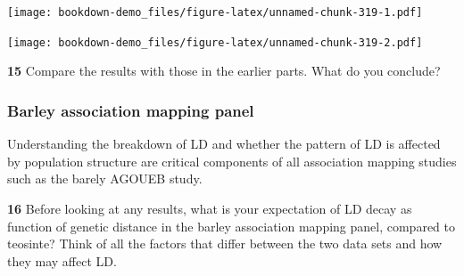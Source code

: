 \documentclass[
]{book}
\makeatletter
\newenvironment{Shaded}{\begin{snugshade}}{\end{snugshade}}
\newcommand{\AttributeTok}[1]{\textcolor[rgb]{0.77,0.63,0.00}{#1}}
\newcommand{\DecValTok}[1]{\textcolor[rgb]{0.00,0.00,0.81}{#1}}
\newcommand{\FloatTok}[1]{\textcolor[rgb]{0.00,0.00,0.81}{#1}}
\newcommand{\FunctionTok}[1]{\textcolor[rgb]{0.00,0.00,0.00}{#1}}
\newcommand{\NormalTok}[1]{#1}
\newcommand{\OtherTok}[1]{\textcolor[rgb]{0.56,0.35,0.01}{#1}}
\newcommand{\SpecialCharTok}[1]{\textcolor[rgb]{0.00,0.00,0.00}{#1}}
\newcommand{\StringTok}[1]{\textcolor[rgb]{0.31,0.60,0.02}{#1}}
\newenvironment{kframe}{%
\medskip{}
\setlength{\fboxsep}{.8em}
 \def\at@end@of@kframe{}%
 \ifinner\ifhmode%
  \def\at@end@of@kframe{\end{minipage}}%
  \begin{minipage}{\columnwidth}%
 \fi\fi%
 \def\FrameCommand##1{\hskip\@totalleftmargin \hskip-\fboxsep
 \colorbox{shadecolor}{##1}\hskip-\fboxsep
     \hskip-\linewidth \hskip-\@totalleftmargin \hskip\columnwidth}%
 \MakeFramed {\advance\hsize-\width
   \@totalleftmargin\z@ \linewidth\hsize
   \@setminipage}}%
 {\par\unskip\endMakeFramed%
 \at@end@of@kframe}
\newenvironment{rmdblock}[1]
  {
  \begin{itemize}
  \renewcommand{\labelitemi}{
    \raisebox{-.7\height}[0pt][0pt]{
      {\setkeys{Gin}{width=3em,keepaspectratio}\texttt{[image: images/\#1]}}
    }
  }
  \setlength{\fboxsep}{1em}
  \begin{kframe}
  \item
  }
  {
  \end{kframe}
  \end{itemize}
  }
\newenvironment{rmdquiz}
  {\begin{rmdblock}{quiz}}
  {\end{rmdblock}}
\makeatother
\begin{document}
\texttt{[image: bookdown-demo\_files/figure-latex/unnamed-chunk-319-1.pdf]}

\begin{Shaded}
\end{Shaded}

\texttt{[image: bookdown-demo\_files/figure-latex/unnamed-chunk-319-2.pdf]}

\begin{rmdquiz}
\textbf{15}
Compare the results with those in the earlier parts. What do you conclude?
\end{rmdquiz}

\hypertarget{barley-association-mapping-panel}{%
\subsubsection{Barley association mapping panel}\label{barley-association-mapping-panel}}

Understanding the breakdown of LD and whether the pattern of LD is affected by population structure are critical components of all association mapping studies such as the barely AGOUEB study.

\begin{rmdquiz}
\textbf{16}
Before looking at any results, what is your expectation of LD decay as function of genetic distance in the barley association mapping panel, compared to teosinte? Think of all the factors that differ between the two data sets and how they may affect LD.
\end{rmdquiz}
\end{document}
